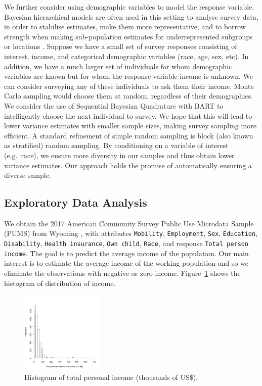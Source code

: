 We further consider using demographic variables to model the response variable. Bayesian hierarchical models are often used in this setting to analyse survey data, in order to stabilise estimates, make them more representative, and to borrow strength when making sub-population estimates for underrepresented subgroups or locations \cite{gelman2006data}. Suppose we have a small set of survey responses consisting of interest, income, and categorical demographic variables (race, age, sex, etc). In addition, we have a much larger set of individuals for whom demographic variables are known but for whom the response variable income is unknown. We can consider surveying any of these individuals to ask them their income. Monte Carlo sampling would choose them at random, regardless of their demographics. We consider the use of Sequential Bayesian Quadrature with BART to intelligently choose the next individual to survey. We hope that this will lead to lower variance estimates with smaller sample sizes, making survey sampling more efficient. A standard refinement of simple random sampling is block (also known as stratified) random sampling. By conditioning on a variable of interest (e.g.~race), we ensure more diversity in our samples and thus obtain lower variance estimates. Our approach holds the promise of automatically ensuring a diverse sample.

\subsection{Exploratory Data Analysis}

We obtain the 2017 American Community Survey Public Use Microdata Sample (PUMS) from Wyoming \cite{ACS}, with attributes \texttt{Mobility}, \texttt{Employment}, \texttt{Sex}, \texttt{Education}, \texttt{Disability}, \texttt{Health insurance}, \texttt{Own child}, \texttt{Race}, and response \texttt{Total person income}. The goal is to predict the average income of the population. Our main interest is to estimate the average income of the working population and so we eliminate the observations with negative or zero income. Figure~\ref{fig:income} shows the histogram of distribution of income.

\begin{figure}[tbh!]
    \centering
    \vspace*{-0.1in}
    \includegraphics[width = 0.35\textwidth]{report/Writing/6.Real_Data_Sets/hist_pop.png}
    \caption{Histogram of total personal income (thousands of US\$).}
    \label{fig:income}
    \vspace*{0in}
\end{figure}

